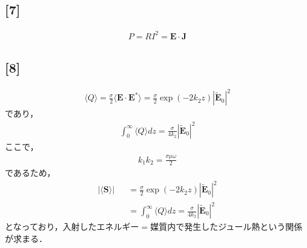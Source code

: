 \documentclass[12pt,dvipdfmx]{jsarticle}
\begin{document}
\subsection*{\large{[7]}}
\begin{eqnarray}
  P = RI^2 = \bm{E}\cdot\bm{J}
\end{eqnarray}
\subsection*{\large{[8]}}
\begin{eqnarray}
  \langle Q\rangle = \frac{\sigma}{2}\langle \bm{E}\cdot\bm{E}^{*}\rangle = \frac{\sigma}{2}\exp(-2k_2z)|\tilde{\bm{E}}_0|^2
\end{eqnarray}
であり，
\begin{eqnarray}
  \int_{0}^{\infty}\langle Q\rangle dz = \frac{\sigma}{4k_2}|\tilde{\bm{E}}_0|^2
\end{eqnarray}
ここで，
\begin{eqnarray}
  k_1 k_2 = \frac{\sigma\mu\omega}{2}
\end{eqnarray}
であるため，
\begin{eqnarray}
  |\langle\bm{S}\rangle|&&=\frac{\sigma}{2}\exp(-2k_2z)|\tilde{\bm{E}}_0|^2\\
  &&=\int_{0}^{\infty}\langle Q\rangle dz=\frac{\sigma}{4k_2}|\tilde{\bm{E}}_0|^2
\end{eqnarray}
となっており，入射したエネルギー$=$媒質内で発生したジュール熱という関係が求まる．
\end{document}
